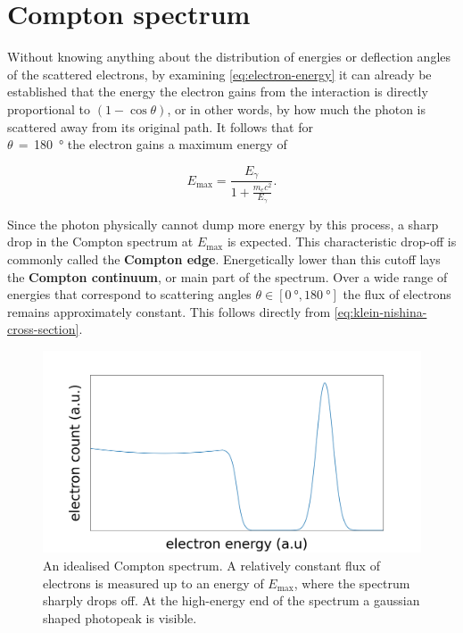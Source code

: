 
\section{Compton spectrum}
\label{sec:compton-spectrum}

Without knowing anything about the distribution of energies or deflection angles of
the scattered electrons, by examining \autoref{eq:electron-energy} it can already be
established that the energy the electron gains from the interaction is directly
proportional to $\left(1-\cos\theta\right)$, or in other words, by how much the
photon is scattered away from its original path. It follows that for \\
$\theta\,=\,$\SI{180}{\degree} the electron gains a maximum energy of

\begin{equation}
\label{eq:maximal-energy}
E_\text{max}=\frac{E_\gamma}{1+\frac{m_e c^2}{E_\gamma}}.
\end{equation}

Since the photon physically cannot dump more energy by this process, a sharp drop in
the Compton spectrum at $E_\text{max}$ is expected. This characteristic drop-off is
commonly called the \textbf{Compton edge}. Energetically lower than this cutoff lays
the \textbf{Compton continuum}, or main part of the spectrum. Over a wide range of
energies that correspond to scattering angles $\theta\in[\SI{0}{\degree},\SI{180}
{\degree}]$ the flux of electrons remains approximately constant. This follows
directly from \autoref{eq:klein-nishina-cross-section}.

\begin{figure}
	\includegraphics[width=1.0\textwidth]{fig/compton-spectrum}
	\caption{An idealised Compton spectrum. A relatively constant flux of
	electrons is measured up to an energy of $E_\text{max}$, where the spectrum
	sharply drops off. At the high-energy end of the spectrum a gaussian shaped
	photopeak is visible.}
	\label{fig:compton-spectrum}
\end{figure}

